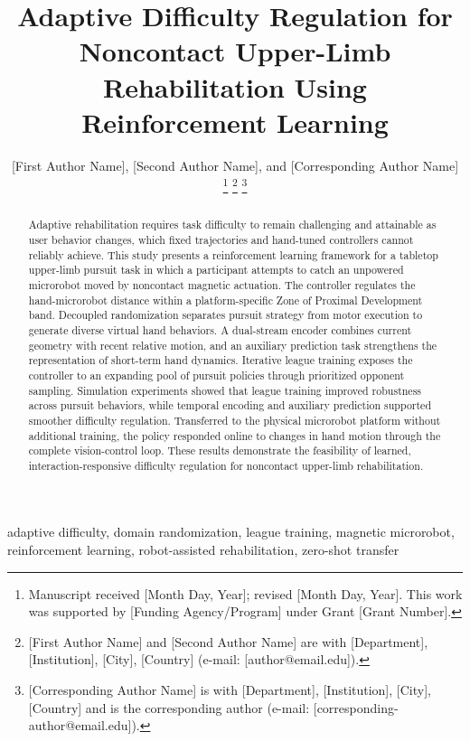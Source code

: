 \documentclass[journal,twoside,web]{ieeecolor2}
\begin{document}
\title{Adaptive Difficulty Regulation for Noncontact Upper-Limb Rehabilitation Using Reinforcement Learning}
\author{[First Author Name], [Second Author Name], and [Corresponding Author Name]
\thanks{Manuscript received [Month Day, Year]; revised [Month Day, Year]. This work was supported by [Funding Agency/Program] under Grant [Grant Number].}
\thanks{[First Author Name] and [Second Author Name] are with [Department], [Institution], [City], [Country] (e-mail: [author@email.edu]).}
\thanks{[Corresponding Author Name] is with [Department], [Institution], [City], [Country] and is the corresponding author (e-mail: [corresponding-author@email.edu]).}}
\maketitle

\begin{abstract}
Adaptive rehabilitation requires task difficulty to remain challenging and attainable as user behavior changes, which fixed trajectories and hand-tuned controllers cannot reliably achieve. This study presents a reinforcement learning framework for a tabletop upper-limb pursuit task in which a participant attempts to catch an unpowered microrobot moved by noncontact magnetic actuation. The controller regulates the hand-microrobot distance within a platform-specific Zone of Proximal Development band. Decoupled randomization separates pursuit strategy from motor execution to generate diverse virtual hand behaviors. A dual-stream encoder combines current geometry with recent relative motion, and an auxiliary prediction task strengthens the representation of short-term hand dynamics. Iterative league training exposes the controller to an expanding pool of pursuit policies through prioritized opponent sampling. Simulation experiments showed that league training improved robustness across pursuit behaviors, while temporal encoding and auxiliary prediction supported smoother difficulty regulation. Transferred to the physical microrobot platform without additional training, the policy responded online to changes in hand motion through the complete vision-control loop. These results demonstrate the feasibility of learned, interaction-responsive difficulty regulation for noncontact upper-limb rehabilitation.
\end{abstract}

\begin{IEEEkeywords}
adaptive difficulty, domain randomization, league training, magnetic microrobot, reinforcement learning, robot-assisted rehabilitation, zero-shot transfer
\end{IEEEkeywords}
\end{document}
